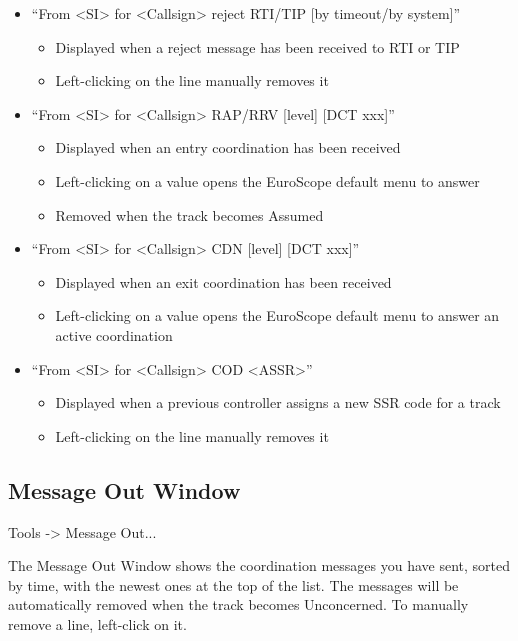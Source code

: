 \documentclass[a4paper,oneside,11pt]{memoir}
\begin{document}
\begin{itemize}
\begin{itemize}
    \end{itemize} 
  \item “From <SI> for <Callsign> reject RTI/TIP [by timeout/by system]”
    \begin{itemize}
      \item Displayed when a reject message has been received to RTI or TIP
      \item Left-clicking on the line manually removes it
    \end{itemize} 
  \item “From <SI> for <Callsign> RAP/RRV [level] [DCT xxx]”
    \begin{itemize}
      \item Displayed when an entry coordination has been received
      \item Left-clicking on a value opens the EuroScope default menu to answer
      \item Removed when the track becomes Assumed
    \end{itemize} 
  \item “From <SI> for <Callsign> CDN [level] [DCT xxx]”
    \begin{itemize}
      \item Displayed when an exit coordination has been received
      \item Left-clicking on a value opens the EuroScope default menu to answer an active coordination
    \end{itemize} 
  \item “From <SI> for <Callsign> COD <ASSR>”
    \begin{itemize}
      \item Displayed when a previous controller assigns a new SSR code for a track
      \item Left-clicking on the line manually removes it
    \end{itemize}     
\end{itemize}

\subsection{Message Out Window}
\label{win:mow}

 Tools -> Message Out...

\bigskip


The Message Out Window shows the coordination messages you have sent, sorted by time, with the newest ones at the top of the list. The messages will be automatically removed when the track becomes Unconcerned. To manually remove a line, left-click on it.
\end{document}
